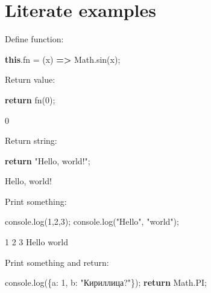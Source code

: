 \documentclass[12pt,russian,a4paper,,fleqn]{extarticle}
\date{}
\newenvironment{Shaded}{}{}
\newcommand{\AttributeTok}[1]{\textcolor[rgb]{0.49,0.56,0.16}{#1}}
\newcommand{\BuiltInTok}[1]{#1}
\newcommand{\ConstantTok}[1]{\textcolor[rgb]{0.53,0.00,0.00}{#1}}
\newcommand{\ControlFlowTok}[1]{\textcolor[rgb]{0.00,0.44,0.13}{\textbf{#1}}}
\newcommand{\DataTypeTok}[1]{\textcolor[rgb]{0.56,0.13,0.00}{#1}}
\newcommand{\DecValTok}[1]{\textcolor[rgb]{0.25,0.63,0.44}{#1}}
\newcommand{\FunctionTok}[1]{\textcolor[rgb]{0.02,0.16,0.49}{#1}}
\newcommand{\KeywordTok}[1]{\textcolor[rgb]{0.00,0.44,0.13}{\textbf{#1}}}
\newcommand{\NormalTok}[1]{#1}
\newcommand{\OperatorTok}[1]{\textcolor[rgb]{0.40,0.40,0.40}{#1}}
\newcommand{\StringTok}[1]{\textcolor[rgb]{0.25,0.44,0.63}{#1}}
\theoremstyle{definition}\newtheorem{definition}{Определение}
\theoremstyle{remark}\newtheorem*{remark}{Примечание}
\numberwithin{equation}{section}
\begin{document}
\section{Literate examples}

Define function:

\begin{Shaded}
\begin{Highlighting}[]
\KeywordTok{this}\OperatorTok{.}\AttributeTok{fn} \OperatorTok{=}\NormalTok{ (x) }\KeywordTok{=\textgreater{}} \BuiltInTok{Math}\OperatorTok{.}\FunctionTok{sin}\NormalTok{(x)}\OperatorTok{;}
\end{Highlighting}
\end{Shaded}

Return value:

\begin{Shaded}
\begin{Highlighting}[]
\ControlFlowTok{return}\NormalTok{ fn(}\DecValTok{0}\NormalTok{)}\OperatorTok{;}
\end{Highlighting}
\end{Shaded}

0

Return string:

\begin{Shaded}
\begin{Highlighting}[]
\ControlFlowTok{return} \StringTok{"Hello, world!"}\OperatorTok{;}
\end{Highlighting}
\end{Shaded}

Hello, world!

Print something:

\begin{Shaded}
\begin{Highlighting}[]
\BuiltInTok{console}\OperatorTok{.}\FunctionTok{log}\NormalTok{(}\DecValTok{1}\OperatorTok{,}\DecValTok{2}\OperatorTok{,}\DecValTok{3}\NormalTok{)}\OperatorTok{;}
\BuiltInTok{console}\OperatorTok{.}\FunctionTok{log}\NormalTok{(}\StringTok{"Hello"}\OperatorTok{,} \StringTok{"world"}\NormalTok{)}\OperatorTok{;}
\end{Highlighting}
\end{Shaded}

1 2 3 Hello world

Print something and return:

\begin{Shaded}
\begin{Highlighting}[]
\BuiltInTok{console}\OperatorTok{.}\FunctionTok{log}\NormalTok{(\{}\DataTypeTok{a}\OperatorTok{:} \DecValTok{1}\OperatorTok{,} \DataTypeTok{b}\OperatorTok{:} \StringTok{"Кириллица?"}\NormalTok{\})}\OperatorTok{;}
\ControlFlowTok{return} \BuiltInTok{Math}\OperatorTok{.}\ConstantTok{PI}\OperatorTok{;}
\end{Highlighting}
\end{Shaded}
\end{document}
